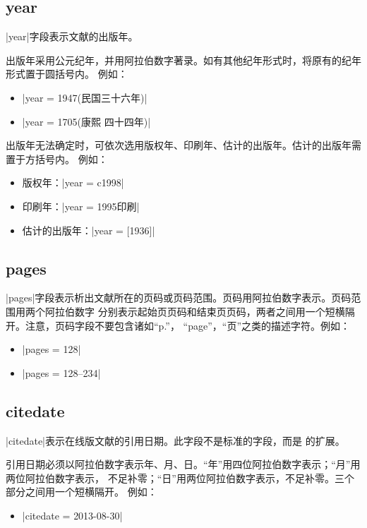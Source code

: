 \subsection{year}\label{subsec:bibfield-year}

|year|字段表示文献的出版年。

出版年采用公元纪年，并用阿拉伯数字著录。如有其他纪年形式时，将原有的纪年形式置于圆括号内。
例如：
\begin{itemize}
\item |year = {1947(民国三十六年)}|
\item |year = {1705(康熙 四十四年)}|
\end{itemize}

出版年无法确定时，可依次选用版权年、印刷年、估计的出版年。估计的出版年需置于方括号内。
例如：
\begin{itemize}
\item 版权年：|year = {c1998}|
\item 印刷年：|year = 1995印刷|
\item 估计的出版年：|year = {[1936]}|
\end{itemize}

\subsection{pages}\label{subsec:bibfield-pages}

|pages|字段表示析出文献所在的页码或页码范围。页码用阿拉伯数字表示。页码范围用两个阿拉伯数字
分别表示起始页页码和结束页页码，两者之间用一个短横隔开。注意，页码字段不要包含诸如``p.''，
``page''，``页''之类的描述字符。例如：
\begin{itemize}
\item |pages = {128}|
\item |pages = {128--234}|
\end{itemize}

\subsection{citedate}\label{subsec:bibfield-citedate}

|citedate|表示在线版文献的引用日期。此字段不是标准的{\BibTeX}字段，而是
{\njuthesis}的扩展。

引用日期必须以阿拉伯数字表示年、月、日。“年”用四位阿拉伯数字表示；“月”用两位阿拉伯数字表示，
不足补零；“日”用两位阿拉伯数字表示，不足补零。三个部分之间用一个短横隔开。
例如：
\begin{itemize}
\item |citedate = {2013-08-30}|
\end{itemize}

